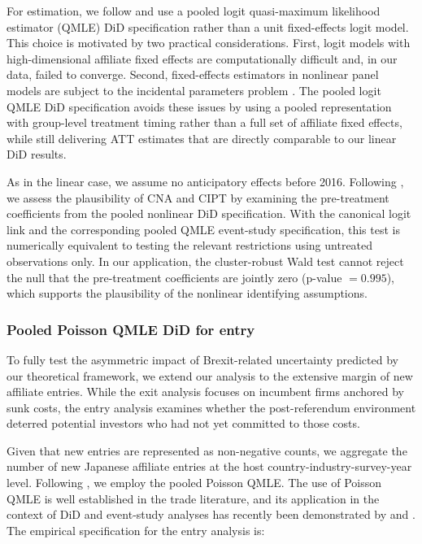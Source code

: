 \documentclass[preprint,11pt,authoryear]{elsarticle}
\begin{document}
For estimation, we follow \citet{wooldridge2023simple} and use a pooled logit quasi-maximum likelihood estimator (QMLE) DiD specification rather than a unit fixed-effects logit model. This choice is motivated by two practical considerations. First, logit models with high-dimensional affiliate fixed effects are computationally difficult and, in our data, failed to converge. Second, fixed-effects estimators in nonlinear panel models are subject to the incidental parameters problem \citep{fernandez2009fixed, fernandez2018fixed}. The pooled logit QMLE DiD specification avoids these issues by using a pooled representation with group-level treatment timing rather than a full set of affiliate fixed effects, while still delivering ATT estimates that are directly comparable to our linear DiD results.

As in the linear case, we assume no anticipatory effects before 2016. Following \citet{wooldridge2023simple}, we assess the plausibility of CNA and CIPT by examining the pre-treatment coefficients from the pooled nonlinear DiD specification. With the canonical logit link and the corresponding pooled QMLE event-study specification, this test is numerically equivalent to testing the relevant restrictions using untreated observations only. In our application, the cluster-robust Wald test cannot reject the null that the pre-treatment coefficients are jointly zero (p-value $= 0.995$), which supports the plausibility of the nonlinear identifying assumptions.

\subsubsection{Pooled Poisson QMLE DiD for entry}

To fully test the asymmetric impact of Brexit-related uncertainty predicted by our theoretical framework, we extend our analysis to the extensive margin of new affiliate entries. While the exit analysis focuses on incumbent firms anchored by sunk costs, the entry analysis examines whether the post-referendum environment deterred potential investors who had not yet committed to those costs.

Given that new entries are represented as non-negative counts, we aggregate the number of new Japanese affiliate entries at the host country-industry-survey-year level.
Following \citet{wooldridge2023simple}, we employ the pooled Poisson QMLE. The use of Poisson QMLE is well established in the trade literature, and its application in the context of DiD and event-study analyses has recently been demonstrated by \cite{nagengast2025staggered} and \cite{nagengast2026european}.
The empirical specification for the entry analysis is:
\end{document}
